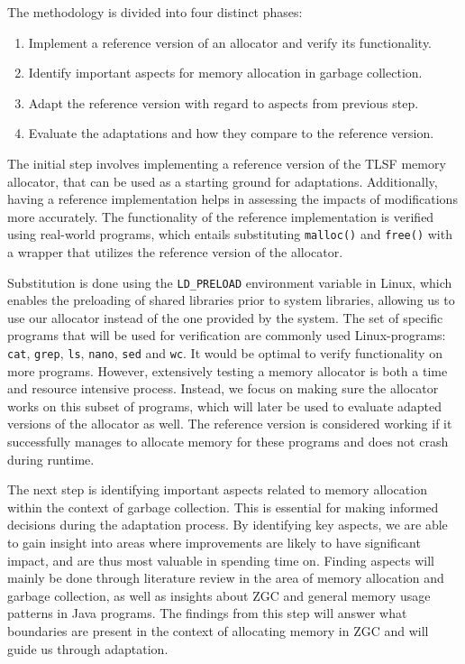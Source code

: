 
The methodology is divided into four distinct phases:

\begin{enumerate}
    \item Implement a reference version of an allocator and verify its functionality.
    \item Identify important aspects for memory allocation in garbage collection.
    \item Adapt the reference version with regard to aspects from previous step.
    \item Evaluate the adaptations and how they compare to the reference version.
\end{enumerate}

The initial step involves implementing a reference version of the TLSF memory allocator, that can be used as a starting ground for adaptations. Additionally, having a reference implementation helps in assessing the impacts of modifications more accurately. The functionality of the reference implementation is verified using real-world programs, which entails substituting \texttt{malloc()} and \texttt{free()} with a wrapper that utilizes the reference version of the allocator. 

Substitution is done using the \texttt{LD\_PRELOAD} environment variable in Linux, which enables the preloading of shared libraries prior to system libraries, allowing us to use our allocator instead of the one provided by the system. The set of specific programs that will be used for verification are commonly used Linux-programs: \texttt{cat}, \texttt{grep}, \texttt{ls}, \texttt{nano}, \texttt{sed} and \texttt{wc}. It would be optimal to verify functionality on more programs. However, extensively testing a memory allocator is both a time and resource intensive process. Instead, we focus on making sure the allocator works on this subset of programs, which will later be used to evaluate adapted versions of the allocator as well. The reference version is considered working if it successfully manages to allocate memory for these programs and does not crash during runtime.

The next step is identifying important aspects related to memory allocation within the context of garbage collection. This is essential for making informed decisions during the adaptation process. By identifying key aspects, we are able to gain insight into areas where improvements are likely to have significant impact, and are thus most valuable in spending time on. Finding aspects will mainly be done through literature review in the area of memory allocation and garbage collection, as well as insights about ZGC and general memory usage patterns in Java programs. The findings from this step will answer what boundaries are present in the context of allocating memory in ZGC and will guide us through adaptation.

